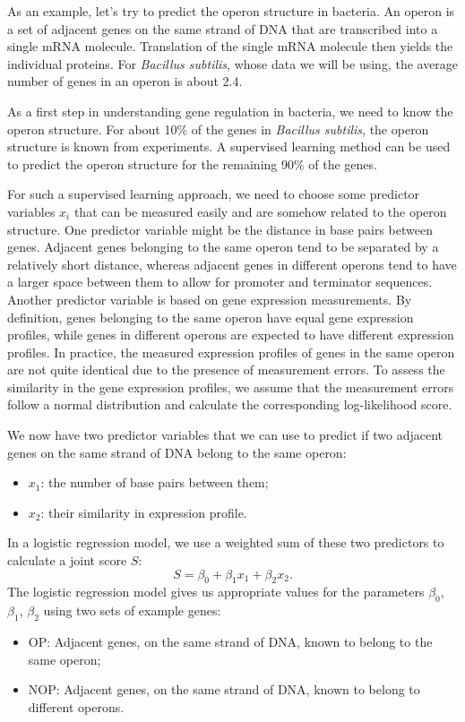 \documentclass{report}
\begin{document}
As an example, let's try to predict the operon structure in bacteria. An operon is a set of adjacent genes on the same strand of DNA that  are transcribed into a single mRNA molecule. Translation of the single mRNA molecule then yields the individual proteins. For {\it Bacillus subtilis}, whose data we will be using, the average number of genes in an operon is about 2.4.

As a first step in understanding gene regulation in bacteria, we need to know the operon structure. For about 10\% of the genes in {\it Bacillus subtilis}, the operon structure is known from experiments. A supervised learning method can be used to predict the operon structure for the remaining 90\% of the genes.

For such a supervised learning approach, we need to choose some predictor variables $x_i$ that can be measured easily and are somehow related to the operon structure. One predictor variable might be the distance in base pairs between genes. Adjacent genes belonging to the same operon tend to be separated by a relatively short distance, whereas adjacent genes in different operons tend to have a larger space between them to allow for promoter and terminator sequences. Another predictor variable is based on gene expression measurements. By definition, genes belonging to the same operon have equal gene expression profiles, while genes in different operons are expected to have different expression profiles. In practice, the measured expression profiles of genes in the same operon are not quite identical due to the presence of measurement errors. To assess the similarity in the gene expression profiles, we assume that the measurement errors follow a normal distribution and calculate the corresponding log-likelihood score.

We now have two predictor variables that we can use to predict if two adjacent genes on the same strand of DNA belong to the same operon:
\begin{itemize}
\item $x_1$: the number of base pairs between them;
\item $x_2$: their similarity in expression profile.
\end{itemize}

In a logistic regression model, we use a weighted sum of these two predictors to calculate a joint score $S$:
\begin{equation}
S = \beta_0 + \beta_1 x_1 + \beta_2 x_2.
\end{equation}
The logistic regression model gives us appropriate values for the parameters $\beta_0$, $\beta_1$, $\beta_2$ using two sets of example genes:
\begin{itemize}
\item OP: Adjacent genes, on the same strand of DNA, known to belong to the same operon;
\item NOP: Adjacent genes, on the same strand of DNA, known to belong to different operons.
\end{itemize}
\end{document}
